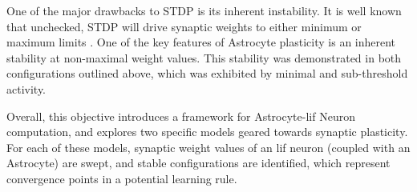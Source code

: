 One of the major drawbacks to STDP is its inherent instability. It is well known
that unchecked, STDP will drive synaptic weights to either minimum or maximum
limits \cite{legenstein_2005}. One of the key features of Astrocyte plasticity
is an inherent stability at non-maximal weight values. This stability was
demonstrated in both configurations outlined above, which was exhibited by
minimal and sub-threshold \ca activity.

Overall, this objective introduces a framework for Astrocyte-\Gls{lif} Neuron
computation, and explores two specific models geared towards synaptic
plasticity. For each of these models, synaptic weight values of an \Gls{lif} neuron
(coupled with an Astrocyte) are swept, and stable configurations are identified,
which represent convergence points in a potential learning rule.





